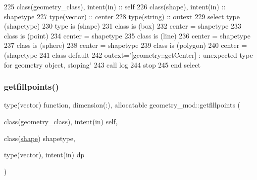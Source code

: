 \begin{DoxyCode}
225     \textcolor{keywordtype}{class}(geometry\_class), \textcolor{keywordtype}{intent(in)} :: self
226     \textcolor{keywordtype}{class}(shape), \textcolor{keywordtype}{intent(in)} :: shapetype
227     \textcolor{keywordtype}{type}(vector) :: center
228     \textcolor{keywordtype}{type}(string) :: outext
229     \textcolor{keywordflow}{select type} (shapetype)
230 \textcolor{keywordflow}{    type is} (shape)
231 \textcolor{keywordflow}{    class is} (box)
232         center = shapetype%
233 \textcolor{keywordflow}{    class is} (point)
234         center = shapetype%
235 \textcolor{keywordflow}{    class is} (line)
236         center = shapetype%
237 \textcolor{keywordflow}{    class is} (sphere)
238         center = shapetype%
239 \textcolor{keywordflow}{    class is} (polygon)
240         center = (shapetype%
241 \textcolor{keywordflow}{        class default}
242         outext=\textcolor{stringliteral}{'[geometry::getCenter] : unexpected type for geometry object, stoping'}
243         \textcolor{keyword}{call }log%
244         stop
245 \textcolor{keywordflow}{    end select}
\end{DoxyCode}
\mbox{\label{namespacegeometry__mod_a12f7679eb15f32630680f2b8504827b3}} 
\subsubsection{\texorpdfstring{getfillpoints()}{getfillpoints()}}
{\footnotesize\ttfamily type(vector) function, dimension(\+:), allocatable geometry\+\_\+mod\+::getfillpoints (\begin{DoxyParamCaption}\item[{class(\mbox{\hyperlink{structgeometry__mod_1_1geometry__class}{geometry\+\_\+class}}), intent(in)}]{self,  }\item[{class(\mbox{\hyperlink{structgeometry__mod_1_1shape}{shape}})}]{shapetype,  }\item[{type(vector), intent(in)}]{dp }\end{DoxyParamCaption})\hspace{0.3cm}{\ttfamily [private]}}



